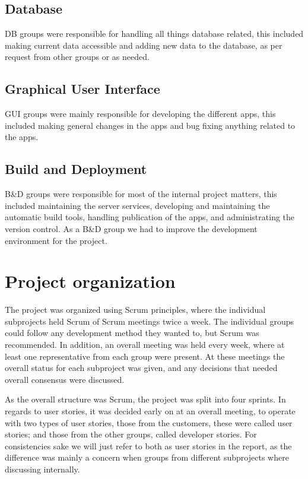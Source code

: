 \subsection{Database}
DB groups were responsible for handling all things database related, this included making current data accessible and adding new data to the database, as per request from other groups or as needed.

\subsection{Graphical User Interface}
GUI groups were mainly responsible for developing the different apps, this included making general changes in the apps and bug fixing anything related to the apps.

\subsection{Build and Deployment}
B\&D groups were responsible for most of the internal project matters, this included maintaining the server services, developing and maintaining the automatic build tools, handling publication of the apps, and administrating the version control. As a B\&D group we had to improve the development environment for the project.


\section{Project organization}
The project was organized using Scrum principles, where the individual subprojects held Scrum of Scrum meetings twice a week. The individual groups could follow any development method they wanted to, but Scrum was recommended.
In addition, an overall meeting was held every week, where at least one representative from each group were present. At these meetings the overall status for each subproject was given, and any decisions that needed overall consensus were discussed.

As the overall structure was Scrum, the project was split into four sprints. In regards to user stories, it was decided early on at an overall meeting, to operate with two types of user stories, those from the customers, these were called user stories; and those from the other groups, called developer stories. For consistencies sake we will just refer to both as user stories in the report, as the difference was mainly a concern when groups from different subprojects where discussing internally.

